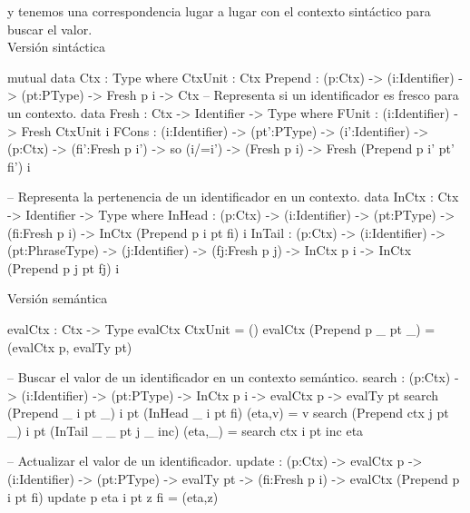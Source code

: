 y tenemos una correspondencia lugar a lugar con el contexto sintáctico para
buscar el valor.\\

\noindent Versi\'on sint\'actica
\begin{code}
mutual
    data Ctx : Type where
        CtxUnit : Ctx
        Prepend : (p:Ctx) -> (i:Identifier) -> (pt:PType) -> 
                  Fresh p i -> Ctx
    -- Representa si un identificador es fresco para un contexto.
    data Fresh : Ctx -> Identifier -> Type where
        FUnit : (i:Identifier) -> Fresh CtxUnit i
        FCons : (i:Identifier) -> (pt':PType) -> (i':Identifier) -> 
                (p:Ctx) -> (fi':Fresh p i') -> so (i/=i') -> (Fresh p i) -> 
                Fresh (Prepend p i' pt' fi') i

-- Representa la pertenencia de un identificador en un contexto.
data InCtx : Ctx -> Identifier -> Type where
    InHead : (p:Ctx) -> (i:Identifier) -> (pt:PType) -> 
             (fi:Fresh p i) -> InCtx (Prepend p i pt fi) i
    InTail : (p:Ctx) -> (i:Identifier) -> (pt:PhraseType) -> 
             (j:Identifier) -> (fj:Fresh p j) -> 
             InCtx p i -> InCtx (Prepend p j pt fj) i
\end{code}

\noindent Versi\'on sem\'antica
\begin{code}
evalCtx : Ctx -> Type
evalCtx CtxUnit = ()
evalCtx (Prepend p _ pt _) = (evalCtx p, evalTy pt)

-- Buscar el valor de un identificador en un contexto semántico.
search : (p:Ctx) -> (i:Identifier) -> (pt:PType) ->
         InCtx p i -> evalCtx p -> evalTy pt
search (Prepend _ i pt _) i pt (InHead _ i pt fi) (eta,v) = v
search (Prepend ctx j pt _) i pt (InTail _ _ pt j _ inc) (eta,_) = search ctx i pt inc eta

-- Actualizar el valor de un identificador.
update : (p:Ctx) -> evalCtx p -> (i:Identifier) -> 
         (pt:PType) -> evalTy pt -> (fi:Fresh p i) -> evalCtx (Prepend p i pt fi)
update p eta i pt z fi = (eta,z)
\end{code}

